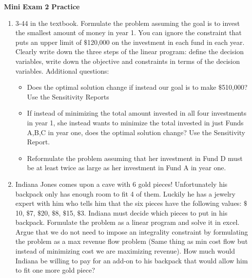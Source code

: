\documentclass{article}[11 pt]    %
\begin{document}
\begin{center}
\textbf{Mini Exam 2 Practice}\\[.1cm]
\end{center}

\begin{enumerate}
\item 3-44 in the textbook.  Formulate the problem assuming the goal is to invest the smallest amount of money in year 1.  You can ignore the constraint that puts an upper limit of $\$$120,000 on the investment in each fund in each year.  Clearly write down the three steps of the linear program: define the decision variables, write down the objective and constraints in terms of the decision variables.
Additional questions:
\begin{itemize}
\item Does the optimal solution change if instead our goal is to make $\$$510,000? Use the Sensitivity Reports
\item If instead of minimizing the total amount invested in all four investments in year 1, she instead wants to minimize the total invested in just Funds A,B,C in year one, does the optimal solution change? Use the Sensitivity Report.
\item Reformulate the problem assuming that her investment in Fund D must be at least twice as large as her investment in Fund A in year one.
\end{itemize}
\item Indiana Jones comes upon a cave with 6 gold pieces!  Unfortunately his backpack only has enough room to fit 4 of them.  Luckily he has a jewelry expert with him who tells him that the six pieces have the following values: $\$$10, $\$$7, $\$$20, $\$$8, $\$$15, $\$$3.  Indiana must decide which pieces to put in his backpack.  Formulate the problem as a linear program and solve it in excel.  Argue that we do not need to impose an integrality constraint by formulating the problem as a max revenue flow problem (Same thing as min cost flow but instead of minimizing cost we are maximizing revenue).  How much would Indiana be willing to pay for an add-on to his backpack that would allow him to fit one more gold piece?
\end{enumerate}
\end{document}
